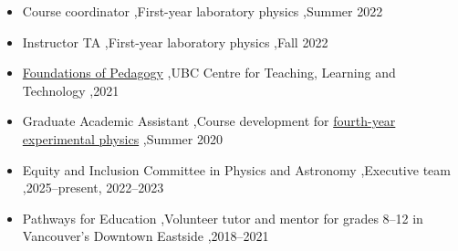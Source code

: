 \documentclass[letterpaper,10pt]{article}
\begin{document}
\begin{itemize}
\item Course coordinator \sep First-year laboratory physics \sep Summer 2022
\item Instructor TA \sep First-year laboratory physics \sep Fall 2022
\item \href{https://cirtl.ubc.ca/get-involved/cirtl-associate/foundations-of-pedagogy/}{Foundations of Pedagogy} \sep UBC Centre for Teaching, Learning and Technology \sep 2021
\item Graduate Academic Assistant \sep Course development for \href{https://phas.ubc.ca/~phys409/?page=syllabus}{fourth-year experimental physics} \sep Summer 2020
\end{itemize}


\begin{itemize}
\item Equity and Inclusion Committee in Physics and Astronomy \sep Executive team \sep 2025--present, 2022--2023
\item Pathways for Education \sep Volunteer tutor and mentor for grades 8--12 in Vancouver's Downtown Eastside \sep 2018--2021
\end{itemize}
\end{document}
